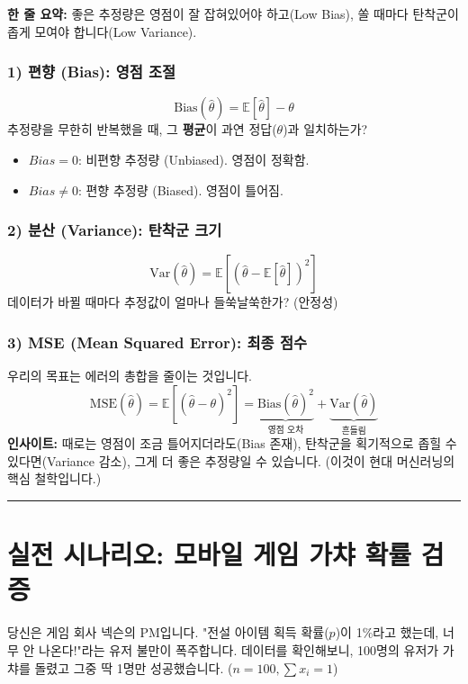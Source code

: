 \documentclass[11pt,a4paper]{book}
\theoremstyle{definition}
\begin{document}
\begin{conceptbox}[title={개념 4: Bias-Variance Trade-off}]
\textbf{한 줄 요약:} 좋은 추정량은 영점이 잘 잡혀있어야 하고(Low Bias), 쏠 때마다 탄착군이 좁게 모여야 합니다(Low Variance).
\end{conceptbox}

\subsubsection*{1) 편향 (Bias): 영점 조절}
$$ \text{Bias}(\hat{\theta}) = \mathbb{E}[\hat{\theta}] - \theta $$
추정량을 무한히 반복했을 때, 그 \textbf{평균}이 과연 정답($\theta$)과 일치하는가?
\begin{itemize}
    \item $Bias = 0$: 비편향 추정량 (Unbiased). 영점이 정확함.
    \item $Bias \neq 0$: 편향 추정량 (Biased). 영점이 틀어짐.
\end{itemize}

\subsubsection*{2) 분산 (Variance): 탄착군 크기}
$$ \text{Var}(\hat{\theta}) = \mathbb{E}[(\hat{\theta} - \mathbb{E}[\hat{\theta}])^2] $$
데이터가 바뀔 때마다 추정값이 얼마나 들쑥날쑥한가? (안정성)

\subsubsection*{3) MSE (Mean Squared Error): 최종 점수}
우리의 목표는 에러의 총합을 줄이는 것입니다.
$$ \text{MSE}(\hat{\theta}) = \mathbb{E}[(\hat{\theta} - \theta)^2] = \underbrace{\text{Bias}(\hat{\theta})^2}_{\text{영점 오차}} + \underbrace{\text{Var}(\hat{\theta})}_{\text{흔들림}} $$
\textbf{인사이트:} 때로는 영점이 조금 틀어지더라도(Bias 존재), 탄착군을 획기적으로 좁힐 수 있다면(Variance 감소), 그게 더 좋은 추정량일 수 있습니다. (이것이 현대 머신러닝의 핵심 철학입니다.)

\vspace{0.5cm}\hrule\vspace{0.5cm}

\section{실전 시나리오: 모바일 게임 가챠 확률 검증}

\begin{storybox}[title={Scenario: 유저들의 불만}]
당신은 게임 회사 넥슨의 PM입니다. "전설 아이템 획득 확률($p$)이 1\%라고 했는데, 너무 안 나온다!"라는 유저 불만이 폭주합니다.
데이터를 확인해보니, 100명의 유저가 가챠를 돌렸고 그중 딱 1명만 성공했습니다. ($n=100, \sum x_i = 1$)
\end{storybox}
\end{document}
